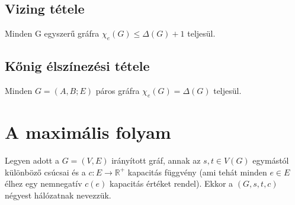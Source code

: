 \documentclass[12pt,a4paper,twoside]{report}
\begin{document}
\subsection{Vizing tétele}
Minden G egyszerű gráfra $\chi_e(G) \leq \Delta(G) + 1$ teljesül.
\subsection{Kőnig élszínezési tétele}
Minden $G = (A, B; E)$ páros gráfra $\chi_e(G) = \Delta(G)$ teljesül.
\section{A maximális folyam}
\df
Legyen adott a $G = (V, E)$ irányított gráf, annak az $s,t\in V(G)$
egymástól különböző csúcsai és a $c : E \rightarrow \mathbb{R}^+$ kapacitás függvény (ami tehát minden $e\in E$ élhez egy nemnegatív $c(e)$ kapacitás értéket rendel). Ekkor a $(G, s,t, c)$ négyest hálózatnak nevezzük.
\df 
\end{document}
